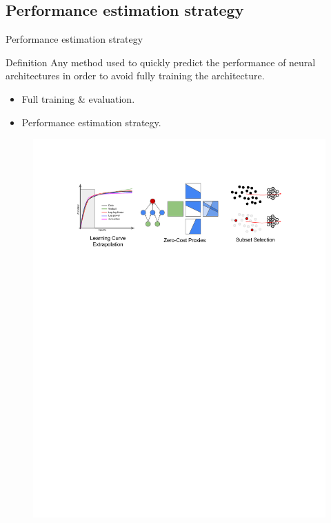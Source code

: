 \documentclass[aspectratio=169,xcolor=dvipsnames]{beamer}
\begin{document}
\subsection{Performance estimation strategy}
\begin{frame}{Performance estimation strategy}
    \begin{block}{Definition}
        Any method used to quickly predict the performance of neural architectures in order to avoid fully training the architecture.
    \end{block}
    \begin{itemize}
        \item Full training \& evaluation.
        \item Performance estimation strategy.
    \end{itemize}
    \begin{figure}[htbp]
        \centering
        \includegraphics[width=.7\linewidth]{perf_estim_strat.pdf}
    \end{figure}
\end{frame}

\end{document}

